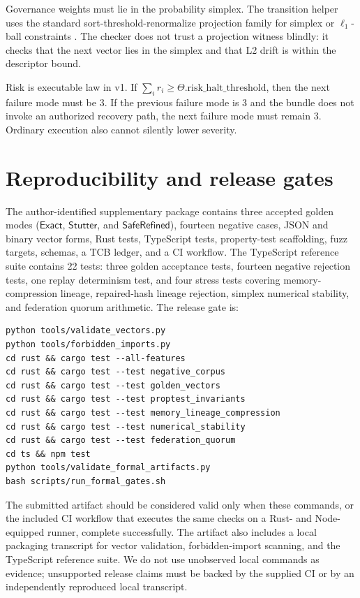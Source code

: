 \documentclass{article}
\newcommand{\Exact}{\ensuremath{\mathsf{Exact}}}
\newcommand{\Stutter}{\ensuremath{\mathsf{Stutter}}}
\newcommand{\SafeRefined}{\ensuremath{\mathsf{SafeRefined}}}
\begin{document}
Governance weights must lie in the probability simplex. The transition helper uses the standard sort-threshold-renormalize projection family for simplex or $\ell_1$-ball constraints \citep{duchi2008projection,wang2013simplex}. The checker does not trust a projection witness blindly: it checks that the next vector lies in the simplex and that L2 drift is within the descriptor bound.

Risk is executable law in v1. If $\sum_i r_i \geq \Theta.\mathrm{risk\_halt\_threshold}$, then the next failure mode must be 3. If the previous failure mode is 3 and the bundle does not invoke an authorized recovery path, the next failure mode must remain 3. Ordinary execution also cannot silently lower severity.

\section{Reproducibility and release gates}
The author-identified supplementary package contains three accepted golden modes (\Exact, \Stutter, and \SafeRefined), fourteen negative cases, JSON and binary vector forms, Rust tests, TypeScript tests, property-test scaffolding, fuzz targets, schemas, a TCB ledger, and a CI workflow. The TypeScript reference suite contains 22 tests: three golden acceptance tests, fourteen negative rejection tests, one replay determinism test, and four stress tests covering memory-compression lineage, repaired-hash lineage rejection, simplex numerical stability, and federation quorum arithmetic. The release gate is:
\begin{lstlisting}[caption={Release gate used by local and CI validation.}]
python tools/validate_vectors.py
python tools/forbidden_imports.py
cd rust && cargo test --all-features
cd rust && cargo test --test negative_corpus
cd rust && cargo test --test golden_vectors
cd rust && cargo test --test proptest_invariants
cd rust && cargo test --test memory_lineage_compression
cd rust && cargo test --test numerical_stability
cd rust && cargo test --test federation_quorum
cd ts && npm test
python tools/validate_formal_artifacts.py
bash scripts/run_formal_gates.sh
\end{lstlisting}
The submitted artifact should be considered valid only when these commands, or the included CI workflow that executes the same checks on a Rust- and Node-equipped runner, complete successfully. The artifact also includes a local packaging transcript for vector validation, forbidden-import scanning, and the TypeScript reference suite. We do not use unobserved local commands as evidence; unsupported release claims must be backed by the supplied CI or by an independently reproduced local transcript.
\end{document}
